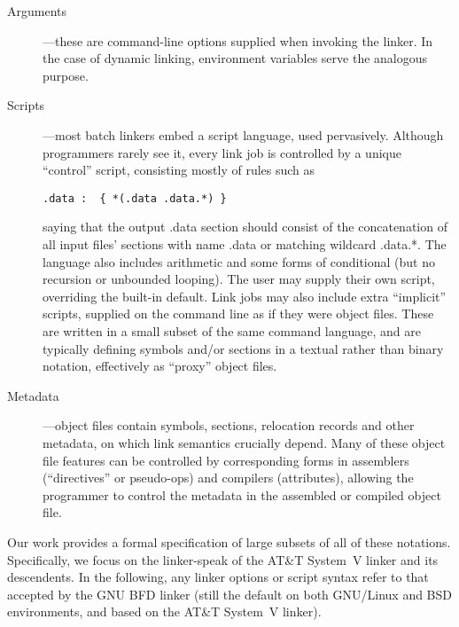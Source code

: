 \begin{description}

\item[Arguments] ---these are command-line options supplied when invoking the linker.
In the case of dynamic linking, environment variables serve the analogous purpose.

\item[Scripts] ---most batch linkers embed a script language, used pervasively.
Although programmers rarely see it, every link job is controlled by a unique ``control'' script,
consisting mostly of rules such as 

\begin{lstlisting}[language=plain,basicstyle=\footnotesize\sffamily]
  .data :  { *(.data .data.*) }
\end{lstlisting}

saying that the output \textsf{.data} section should consist of the concatenation of 
all input files' sections with name \textsf{.data} or matching wildcard \textsf{.data.*}.
The language also includes arithmetic and some forms of conditional (but no recursion or unbounded looping).
The user may supply their own script, overriding the built-in default.
Link jobs may also include extra ``implicit'' scripts, 
supplied on the command line as if they were object files.
These are written in a small subset of the same command language, and are typically 
defining symbols and/or sections in a textual rather than binary notation, effectively
as ``proxy'' object files.

\item[Metadata] ---object files contain symbols, sections, relocation records
and other metadata, on which link semantics crucially depend. Many of these 
object file features can be controlled by corresponding forms in assemblers 
(``directives'' or pseudo-ops) and compilers (attributes), allowing the programmer
to control the metadata in the assembled or compiled object file.

\end{description}

Our work provides a formal specification
of large subsets of all of these notations.
Specifically, we focus on the linker-speak of the AT\&T System~V linker
and its descendents. 
In the following, any linker options or script syntax
refer to that accepted by the GNU BFD linker
(still the default on both GNU/Linux and BSD environments, and 
based on the AT\&T System~V linker).


